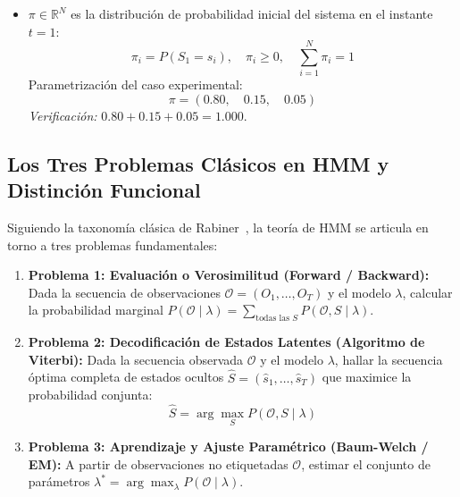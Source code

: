 \documentclass[11pt,a4paper]{article}
\begin{document}
\begin{itemize}
\begin{equation}
    \end{equation}
    Parametrización del caso experimental:
    \begin{equation}
    B = \begin{pmatrix}
    0.85 & 0.12 & 0.03 \\
    0.40 & 0.50 & 0.10 \\
    0.10 & 0.50 & 0.40
    \end{pmatrix}
    \end{equation}
    \textit{Verificación de cierre estocástico:}
    Fila 1: $0.85 + 0.12 + 0.03 = 1.000$; 
    Fila 2: $0.40 + 0.50 + 0.10 = 1.000$; 
    Fila 3: $0.10 + 0.50 + 0.40 = 1.000$.
    \item $\pi \in \mathbb{R}^N$ es la distribución de probabilidad inicial del sistema en el instante $t = 1$:
    \begin{equation}
    \pi_i = P(S_1 = s_i), \quad \pi_i \ge 0, \quad \sum_{i=1}^N \pi_i = 1
    \end{equation}
    Parametrización del caso experimental:
    \begin{equation}
    \pi = (0.80, \quad 0.15, \quad 0.05)
    \end{equation}
    \textit{Verificación:} $0.80 + 0.15 + 0.05 = 1.000$.
\end{itemize}

\subsection{Los Tres Problemas Clásicos en HMM y Distinción Funcional}

Siguiendo la taxonomía clásica de Rabiner~\cite{rabiner1989tutorial}, la teoría de HMM se articula en torno a tres problemas fundamentales:
\begin{enumerate}
    \item \textbf{Problema 1: Evaluación o Verosimilitud (Forward / Backward):} Dada la secuencia de observaciones $\mathcal{O} = (O_1, \dots, O_T)$ y el modelo $\lambda$, calcular la probabilidad marginal $P(\mathcal{O} \mid \lambda) = \sum_{\text{todas las } S} P(\mathcal{O}, S \mid \lambda)$.
    \item \textbf{Problema 2: Decodificación de Estados Latentes (Algoritmo de Viterbi):} Dada la secuencia observada $\mathcal{O}$ y el modelo $\lambda$, hallar la secuencia óptima completa de estados ocultos $\hat{S} = (\hat{s}_1, \dots, \hat{s}_T)$ que maximice la probabilidad conjunta:
    \begin{equation}
    \hat{S} = \arg\max_{S} P(\mathcal{O}, S \mid \lambda)
    \end{equation}
    \item \textbf{Problema 3: Aprendizaje y Ajuste Paramétrico (Baum-Welch / EM):} A partir de observaciones no etiquetadas $\mathcal{O}$, estimar el conjunto de parámetros $\lambda^* = \arg\max_\lambda P(\mathcal{O} \mid \lambda)$.
\end{enumerate}
\end{document}
